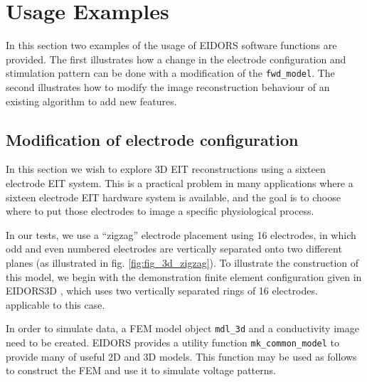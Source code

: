 \documentclass[12pt]{iopart}
\begin{document}
\section{ Usage Examples}

In this section two examples of the usage of EIDORS
software functions are provided. The first illustrates
how a change in the electrode configuration and stimulation 
pattern can be done
with a modification of the {\tt fwd\_model}.
The second illustrates how to modify the image reconstruction
behaviour of an existing algorithm to
add new features.

\subsection{Modification of electrode configuration}

In this section we wish to explore 3D EIT reconstructions
using a sixteen electrode EIT system. This is a practical
problem in many applications where a sixteen electrode
EIT hardware system is available, and the goal is to 
choose where to put those electrodes to image a specific
physiological process.

In our tests, we use a ``zigzag'' electrode placement 
using 16 electrodes, in which odd and even numbered
electrodes are vertically separated onto two different
planes (as illustrated in fig. \ref{fig:fig_3d_zigzag}).
To illustrate the construction of this model, we begin
with the demonstration finite element configuration
given in EIDORS3D \cite{Polydorides_and_Lionheart_2002},
which uses two vertically separated rings of 16 electrodes.
applicable to this case.

In order to simulate data, a FEM model object {\tt mdl\_3d}
and a conductivity image need to be created.
EIDORS provides a utility function {\tt mk\_common\_model}
to provide many of useful 2D and 3D models. This function
may be used as follows to construct the FEM and use it
to simulate voltage patterns.
\end{document}
